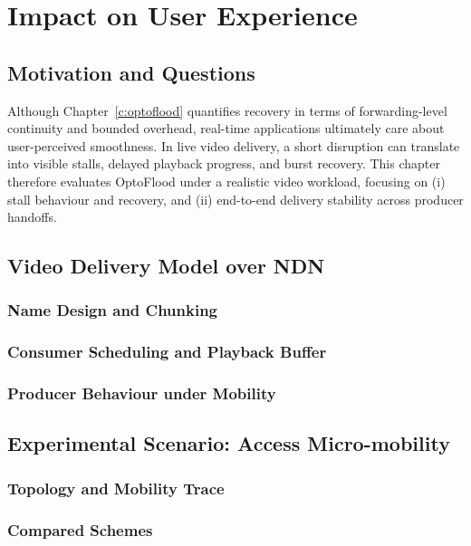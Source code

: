 \chapter{Impact on User Experience}
\label{c:impact_on_user_experience}

\section{Motivation and Questions}
Although Chapter~\ref{c:optoflood} quantifies recovery in terms of forwarding-level continuity and bounded overhead, real-time applications ultimately care about user-perceived smoothness. In live video delivery, a short disruption can translate into visible stalls, delayed playback progress, and burst recovery. This chapter therefore evaluates OptoFlood under a realistic video workload, focusing on (i) stall behaviour and recovery, and (ii) end-to-end delivery stability across producer handoffs.


\section{Video Delivery Model over NDN}
\subsection{Name Design and Chunking}
\subsection{Consumer Scheduling and Playback Buffer}
\subsection{Producer Behaviour under Mobility}


\section{Experimental Scenario: Access Micro-mobility}
\subsection{Topology and Mobility Trace}
\subsection{Compared Schemes}

